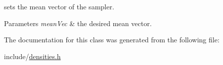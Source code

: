 sets the mean vector of the sampler. 


\begin{DoxyParams}{Parameters}
{\em mean\+Vec} & the desired mean vector. \\
\hline
\end{DoxyParams}


The documentation for this class was generated from the following file\+:\begin{DoxyCompactItemize}
\item 
include/\hyperlink{densities_8h}{densities.\+h}\end{DoxyCompactItemize}
